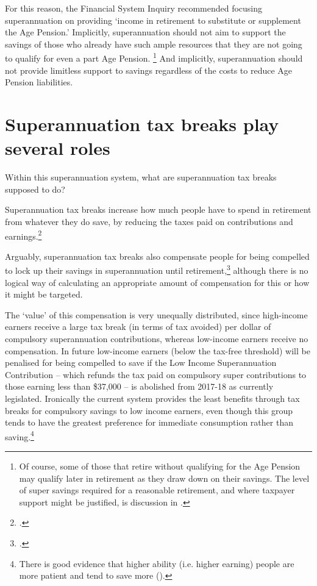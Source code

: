 \documentclass{grattanAlpha}
\begin{document}
 For this reason, the Financial System Inquiry recommended focusing superannuation on providing ‘income in retirement to substitute or supplement the Age Pension.’ Implicitly, superannuation should not aim to support the savings of those who already have such ample resources that they are not going to qualify for even a part Age Pension.%
\footnote{%
Of course, some of those that retire without qualifying for the Age Pension may qualify later in retirement as they draw down on their savings. The level of super savings required for a reasonable retirement, and where taxpayer support might be justified, is discussion in .
}
  And implicitly, superannuation should not provide limitless support to savings regardless of the costs to reduce Age Pension liabilities.

\section{Superannuation tax breaks play several roles}\label{sec:SUPER-2-4}
Within this superannuation system, what are superannuation tax breaks supposed to do?

Superannuation tax breaks increase how much people have to spend in retirement from whatever they do save, by reducing the taxes paid on contributions and earnings.\footcite{Keating2015}  

Arguably, superannuation tax breaks also compensate people for being compelled to lock up their savings in superannuation until retirement,\footcite{Hockey2015IGR} although there is no logical way of calculating an appropriate amount of compensation for this or how it might be targeted. 

The ‘value’ of this compensation is very unequally distributed, since high-income earners receive a large tax break (in terms of tax avoided) per dollar of compulsory superannuation contributions, whereas low-income earners receive no compensation. In future low-income earners (below the tax-free threshold) will be penalised for being compelled to save if the Low Income Superannuation Contribution – which refunds the tax paid on compulsory super contributions to those earning less than \$37,000  – is abolished from 2017-18 as currently legislated. Ironically the current system provides the least benefits through tax breaks for compulsory savings to low income earners, even though this group tends to have the greatest preference for immediate consumption rather than saving.\footnote{There is good evidence that higher ability (i.e. higher earning) people are more patient and tend to save more (\textcite[][616--623]{BanksDiamond2010}).} 
\end{document}
